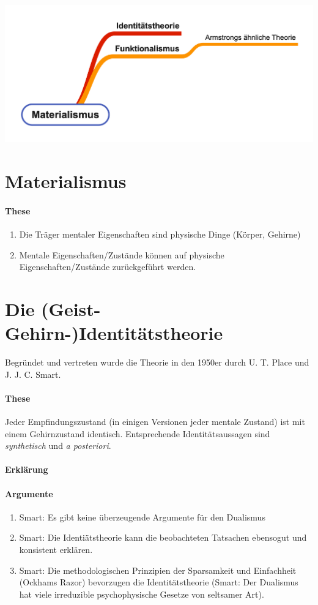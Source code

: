 \documentclass[../main.tex]{subfiles}
\begin{document}
\includegraphics[width=\textwidth]{images/Materialismus_Uebersicht.png}

\section{Materialismus} 
\paragraph{These}
\begin{enumerate}
	\item Die Träger mentaler Eigenschaften sind physische Dinge (Körper, Gehirne)
	\item Mentale Eigenschaften/Zustände können auf physische Eigenschaften/Zustände zurückgeführt werden. 
\end{enumerate}

\section{Die (Geist-Gehirn-)Identitätstheorie}
Begründet und vertreten wurde die Theorie in den 1950er durch U. T. Place und J. J. C. Smart.
\paragraph{These} Jeder Empfindungszustand (in einigen Versionen jeder mentale Zustand) ist mit einem Gehirnzustand identisch. Entsprechende Identitätsaussagen sind \textit{synthetisch} und \textit{a posteriori}. 
\paragraph{Erklärung} 
\paragraph{Argumente}
\begin{enumerate}
	\item Smart: Es gibt keine überzeugende Argumente für den Dualismus
	\item Smart: Die Identiätstheorie kann die beobachteten Tatsachen ebensogut und konsistent erklären.
	\item Smart: Die methodologischen Prinzipien der Sparsamkeit und Einfachheit (Ockhams Razor) bevorzugen die Identitätstheorie (Smart: Der Dualismus hat viele irreduzible psychophysische Gesetze von seltsamer Art).
\end{enumerate}
\end{document}
